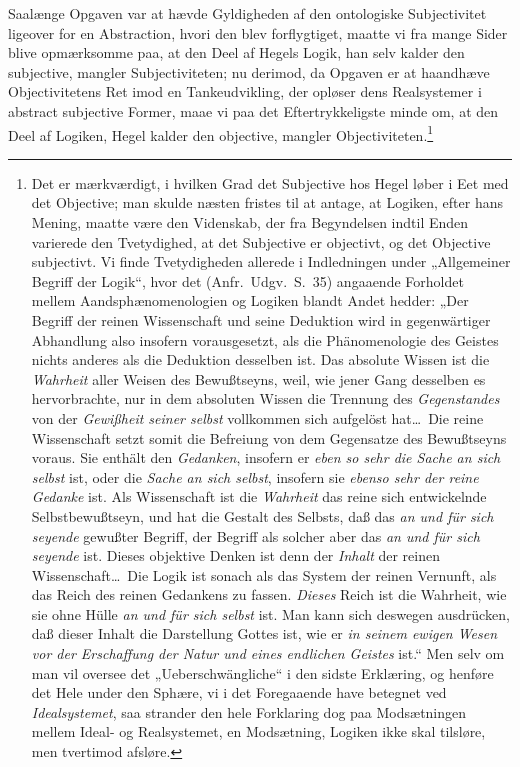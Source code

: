 \documentclass[12pt]{book}
\begin{document}
Saalænge Opgaven var at hævde Gyldigheden af den ontologiske Subjectivitet ligeover for en Abstraction,
hvori den blev forflygtiget, maatte vi fra mange Sider blive opmærksomme paa, at den Deel af Hegels
Logik, han selv kalder den subjective, mangler Subjectiviteten; nu derimod, da Opgaven er at haandhæve
Objectivitetens Ret imod en Tankeudvikling, der opløser dens Realsystemer i abstract subjective Former,
maae vi paa det Eftertrykkeligste minde om, at den Deel af Logiken, Hegel kalder den objective, mangler
Objectiviteten.\footnote{Det er mærkværdigt, i hvilken Grad det Subjective hos Hegel løber i Eet med
det Objective; man skulde næsten fristes til at antage, at Logiken, efter hans Mening, maatte være den
Videnskab, der fra Begyndelsen indtil Enden varierede den Tvetydighed, at det Subjective er objectivt,
og det Objective subjectivt. Vi finde Tvetydigheden allerede i Indledningen under „Allgemeiner Begriff
der Logik“, hvor det (Anfr.\ Udgv.\ S.~35) angaaende Forholdet mellem Aandsphænomenologien og Logiken
blandt Andet hedder: „Der Begriff der reinen Wissenschaft und seine Deduktion wird in gegenwärtiger
Abhandlung also insofern vorausgesetzt, als die Phänomenologie des Geistes nichts anderes als die
Deduktion desselben ist. Das absolute Wissen ist die \emph{Wahrheit} aller Weisen des Bewußtseyns,
weil, wie jener Gang desselben es hervorbrachte, nur in dem absoluten Wissen die Trennung des
\emph{Gegenstandes} von der \emph{Gewißheit seiner selbst} vollkommen sich aufgelöst hat\ldots\ Die
reine Wissenschaft setzt somit die Befreiung von dem Gegensatze des Bewußtseyns voraus. Sie enthält den
\emph{Gedanken}, insofern er \emph{eben so sehr die Sache an sich selbst} ist, oder die \emph{Sache an
sich selbst}, insofern sie \emph{ebenso sehr der reine Gedanke} ist. Als Wissenschaft ist die
\emph{Wahrheit} das reine sich entwickelnde Selbstbewußtseyn, und hat die Gestalt des Selbsts, daß das
\emph{an und für sich seyende} gewußter Begriff, der Begriff als solcher aber das \emph{an und für sich
seyende} ist. Dieses objektive Denken ist denn der \emph{Inhalt} der reinen Wissenschaft\ldots\ Die
Logik ist sonach als das System der reinen Vernunft, als das Reich des reinen Gedankens zu fassen.
\emph{Dieses} Reich ist die Wahrheit, wie sie ohne Hülle \emph{an und für sich selbst} ist. Man kann
sich deswegen ausdrücken, daß dieser Inhalt die Darstellung Gottes ist, wie er \emph{in seinem ewigen
Wesen vor der Erschaffung der Natur und eines endlichen Geistes} ist.“ Men selv om man vil oversee det
„Ueberschwängliche“ i den sidste Erklæring, og henføre det Hele under den Sphære, vi i det Foregaaende
have betegnet ved \emph{Idealsystemet}, saa strander den hele Forklaring dog paa Modsætningen mellem
Ideal- og Realsystemet, en Modsætning, Logiken ikke skal tilsløre, men tvertimod afsløre.}
\end{document}
